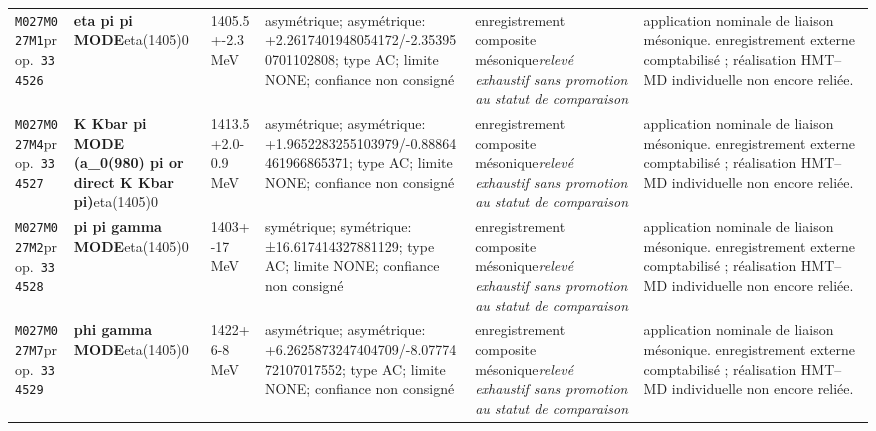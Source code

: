 \begin{landscape}
\begin{longtable}{L{1.85cm}L{4.45cm}L{2.35cm}L{4.05cm}L{3.35cm}L{7.15cm}}
\texttt{M027}\newline \texttt{M027M1}\newline prop.\ \texttt{334526} & \textbf{eta pi pi MODE}\newline eta(1405)0 & 1405.5+-2.3\,MeV & asymétrique; asymétrique: +2.2617401948054172/-2.353950701102808; type AC; limite NONE; confiance non consigné & enregistrement composite mésonique\newline \emph{relevé exhaustif sans promotion au statut de comparaison} & application nominale de liaison mésonique. enregistrement externe comptabilisé ; réalisation HMT--MD individuelle non encore reliée. \\
\texttt{M027}\newline \texttt{M027M4}\newline prop.\ \texttt{334527} & \textbf{K Kbar pi MODE (a\_\allowbreak{}0(980) pi or direct K Kbar pi)}\newline eta(1405)0 & 1413.5+2.0-0.9\,MeV & asymétrique; asymétrique: +1.9652283255103979/-0.88864461966865371; type AC; limite NONE; confiance non consigné & enregistrement composite mésonique\newline \emph{relevé exhaustif sans promotion au statut de comparaison} & application nominale de liaison mésonique. enregistrement externe comptabilisé ; réalisation HMT--MD individuelle non encore reliée. \\
\texttt{M027}\newline \texttt{M027M2}\newline prop.\ \texttt{334528} & \textbf{pi pi gamma MODE}\newline eta(1405)0 & 1403+-17\,MeV & symétrique; symétrique: ±16.617414327881129; type AC; limite NONE; confiance non consigné & enregistrement composite mésonique\newline \emph{relevé exhaustif sans promotion au statut de comparaison} & application nominale de liaison mésonique. enregistrement externe comptabilisé ; réalisation HMT--MD individuelle non encore reliée. \\
\texttt{M027}\newline \texttt{M027M7}\newline prop.\ \texttt{334529} & \textbf{phi gamma MODE}\newline eta(1405)0 & 1422+6-8\,MeV & asymétrique; asymétrique: +6.2625873247404709/-8.0777472107017552; type AC; limite NONE; confiance non consigné & enregistrement composite mésonique\newline \emph{relevé exhaustif sans promotion au statut de comparaison} & application nominale de liaison mésonique. enregistrement externe comptabilisé ; réalisation HMT--MD individuelle non encore reliée. \\

\end{longtable}
\end{landscape}
